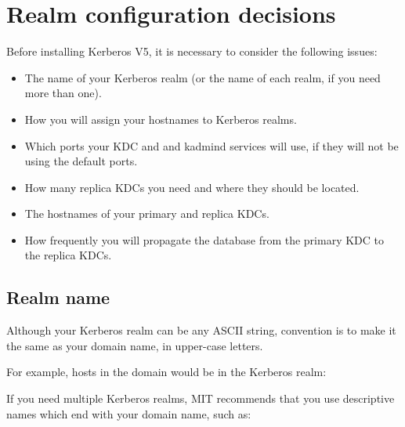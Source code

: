 \documentclass[letterpaper,10pt,english]{sphinxmanual}
\begin{document}
\chapter{Realm configuration decisions}
\label{\detokenize{admin/realm_config:realm-configuration-decisions}}\label{\detokenize{admin/realm_config::doc}}
Before installing Kerberos V5, it is necessary to consider the
following issues:
\begin{itemize}
\item {} 
The name of your Kerberos realm (or the name of each realm, if you
need more than one).

\item {} 
How you will assign your hostnames to Kerberos realms.

\item {} 
Which ports your KDC and and kadmind services will use, if they will
not be using the default ports.

\item {} 
How many replica KDCs you need and where they should be located.

\item {} 
The hostnames of your primary and replica KDCs.

\item {} 
How frequently you will propagate the database from the primary KDC
to the replica KDCs.

\end{itemize}


\section{Realm name}
\label{\detokenize{admin/realm_config:realm-name}}
Although your Kerberos realm can be any ASCII string, convention is to
make it the same as your domain name, in upper-case letters.

For example, hosts in the domain  would be in the
Kerberos realm:

%
\begin{sphinxVerbatim}[commandchars=\\\{\}]
\end{sphinxVerbatim}

If you need multiple Kerberos realms, MIT recommends that you use
descriptive names which end with your domain name, such as:

%
\begin{sphinxVerbatim}[commandchars=\\\{\}]
\end{sphinxVerbatim}
\end{document}
